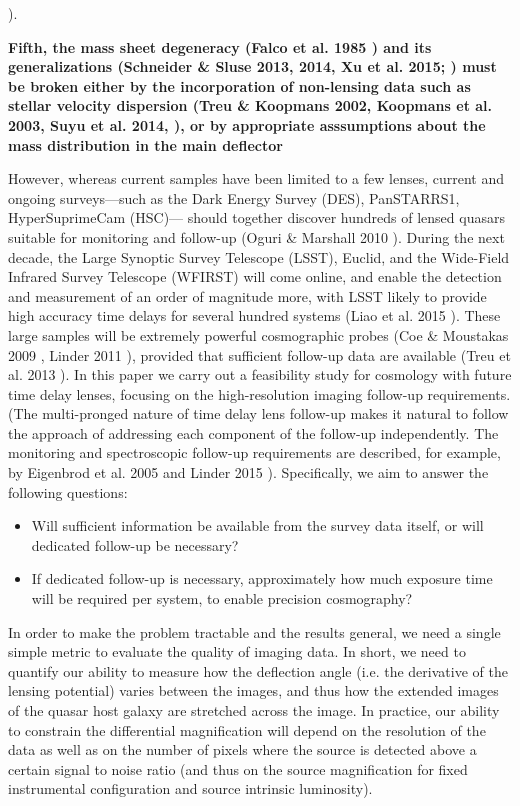 \documentclass[a4paper,11pt]{article}
\begin{document}
\citep{2013MNRAS.432..679C}). {\bf Fifth, the mass sheet degeneracy (Falco et 
al. 1985 \cite{FGS85}) and its generalizations (Schneider \& Sluse
2013, 2014, Xu et al. 2015; \cite{SS13,SS14,Xu15}) must be broken
either by the incorporation of non-lensing data such as stellar
velocity dispersion (Treu \& Koopmans 2002, Koopmans et al. 2003, Suyu
et al. 2014,
\cite{2002MNRAS.337L...6T,2003ApJ...599...70K,2014ApJ...788L..35S}),
or by appropriate asssumptions about the mass distribution in the main
deflector \citep{Xu15}
  
However, whereas current samples have been limited to a few lenses,
current and ongoing surveys---such as the Dark Energy Survey (DES),
PanSTARRS1, HyperSuprimeCam (HSC)--- should together discover hundreds
of lensed quasars suitable for monitoring and follow-up (Oguri \&
Marshall 2010 \cite{2010MNRAS.405.2579O}). During the next decade, the
Large Synoptic Survey Telescope (LSST), Euclid, and the Wide-Field
Infrared Survey Telescope (WFIRST) will come online, and enable the
detection and measurement of an order of magnitude more, with LSST
likely to provide high accuracy time delays for several hundred
systems (Liao et al. 2015 \cite{2015ApJ...800...11L}). These large
samples will be extremely powerful cosmographic probes (Coe \&
Moustakas 2009 \citep{2009ApJ...706...45C}, Linder 2011
\citep{2011PhRvD..84l3529L}), provided that sufficient follow-up data
are available (Treu et al. 2013 \citep{2013arXiv1306.1272T}). In this
paper we carry out a feasibility study for cosmology with future time
delay lenses, focusing on the  high-resolution imaging follow-up
requirements. (The multi-pronged nature of time delay lens follow-up
makes it natural to follow the approach of addressing each component
of the follow-up independently. The monitoring and spectroscopic
follow-up requirements are described, for example, by Eigenbrod et al.
2005 \cite{2005A&A...436...25E} and Linder 2015
\cite{2015PhRvD..91h3511L}). Specifically, we aim to answer the
following questions:
\begin{itemize}
    \item Will sufficient information be available from the survey
            data itself, or will dedicated follow-up be necessary?
    \item If dedicated follow-up is necessary, approximately how much
            exposure time will be required per system, to enable
            precision cosmography?
\end{itemize}

In order to make the problem tractable and the results general, we
need a single simple metric to evaluate the quality of imaging data.
In short, we need to quantify our ability to measure how the
deflection angle (i.e. the derivative of the lensing potential) varies
between the images, and thus how the extended images of the quasar
host galaxy are stretched across the image. In practice, our ability
to constrain the differential magnification will depend on the
resolution of the data as well as on the number of pixels where the
source is detected above a certain signal to noise ratio (and thus on
the source magnification for fixed instrumental configuration and
source intrinsic luminosity).

}
\end{document}
